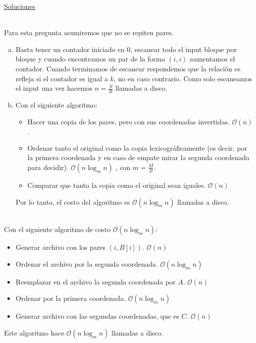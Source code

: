 \documentclass[dcc,uchile]{fcfmcourse}
\begin{document}
\newpage
\begin{center}
{\huge \underline{Soluciones}}
\end{center}
\begin{problems}
\\
Para esta pregunta asumiremos que no se repiten pares.
\begin{enumerate}[a)]
\item Basta tener un contador iniciado en $0$, escanear todo el input bloque por bloque y cuando encontramos un par de la forma $(i,i)$ aumentamos el contador. Cuando terminamos de escanear respondemos que la relación es refleja si el contador es igual a $k$, no en caso contrario. Como solo escaneamos el input una vez hacemos $n=\frac{N}{B}$ llamadas a disco. \flash
\item Con el siguiente algoritmo:
\begin{itemize}
    \item Hacer una copia de los pares, pero con sus coordenadas invertidas. $\mathcal{O}(n)$.
    \item Ordenar tanto el original como la copia lexicográficamente (es decir, por la primera coordenada y en caso de empate mirar la segunda coordenada para decidir). $\mathcal{O}(n\log_{m}n)$ , con $m = \frac{M}{B}$.
    \item Comparar que tanto la copia como el original sean iguales. $\mathcal{O}(n)$
\end{itemize}
Por lo tanto, el costo del algoritmo es $\mathcal{O}(n\log_{m}n)$ llamadas a disco.
\end{enumerate}
\\
Con el siguiente algoritmo de costo $\mathcal{O}(n\log_{m}n)$:
\begin{itemize}
    \item Generar archivo con los pares $(i, B[i])$. $\mathcal{O}(n)$
    \item Ordenar el archivo por la segunda coordenada. $\mathcal{O}(n\log_{m}n)$
    \item Reemplazar en el archivo la segunda coordenada por $A$. $\mathcal{O}(n)$
    \item Ordenar por la primera coordenada. $\mathcal{O}(n\log_{m} n)$
    \item Generar archivo con las segundas coordenadas, que es $C$. $\mathcal{O}(n)$
\end{itemize}
Este algoritmo hace $\mathcal{O}(n\log_{m} n)$ llamadas a disco.\\

\end{problems}
\end{document}
